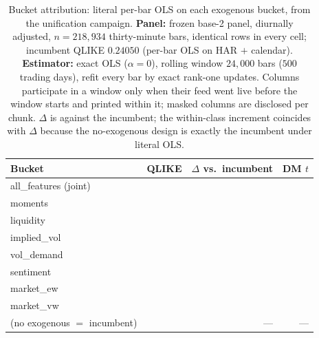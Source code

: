 \begin{table}[H]
\centering
\caption{Bucket attribution: literal per-bar OLS on each exogenous bucket,
from the unification campaign. \textbf{Panel:} frozen base-2 panel,
diurnally adjusted, $n = 218{,}934$ thirty-minute bars, identical rows in
every cell; incumbent QLIKE $0.24050$ (per-bar OLS on HAR $+$ calendar).
\textbf{Estimator:} exact OLS ($\alpha = 0$), rolling window $24{,}000$ bars
($500$ trading days), refit every bar by exact rank-one updates. Columns
participate in a window only when their feed went live before the window
starts and printed within it; masked columns are disclosed per chunk.
$\Delta$ is against the incumbent; the within-class increment coincides
with $\Delta$ because the no-exogenous design is exactly the incumbent
under literal OLS.}
\label{tab:buckets}
\begin{tabular}{lrrr}
\toprule
Bucket & QLIKE & $\Delta$ vs.\ incumbent & DM $t$ \\
\midrule
all\_features (joint) & \unifAllFeaturesQLIKE{} & \unifAllFeaturesDelta{} & \unifAllFeaturesDM{} \\
\midrule
moments      & \unifMomentsQLIKE{}    & \unifMomentsDelta{}    & \unifMomentsDM{} \\
liquidity    & \unifLiquidityQLIKE{}  & \unifLiquidityDelta{}  & \unifLiquidityDM{} \\
implied\_vol & \unifImpliedVolQLIKE{} & \unifImpliedVolDelta{} & \unifImpliedVolDM{} \\
vol\_demand  & \unifVolDemandQLIKE{}  & \unifVolDemandDelta{}  & \unifVolDemandDM{} \\
sentiment    & \unifSentimentQLIKE{}  & \unifSentimentDelta{}  & \unifSentimentDM{} \\
market\_ew   & \unifMarketEwQLIKE{}   & \unifMarketEwDelta{}   & \unifMarketEwDM{} \\
market\_vw   & \unifMarketVwQLIKE{}   & \unifMarketVwDelta{}   & \unifMarketVwDM{} \\
\midrule
(no exogenous $=$ incumbent) & \unifAzeroQLIKE{} & --- & --- \\
\bottomrule
\end{tabular}
\end{table}

